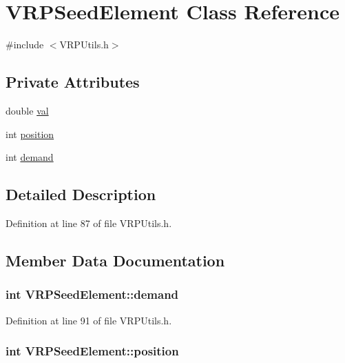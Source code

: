 \hypertarget{class_v_r_p_seed_element}{
\section{VRPSeedElement Class Reference}
\label{class_v_r_p_seed_element}
}


{\ttfamily \#include $<$VRPUtils.h$>$}

\subsection*{Private Attributes}
\begin{DoxyCompactItemize}
\item 
double \hyperlink{class_v_r_p_seed_element_a5afd4ea53120549e301ed93f7df7b859}{val}
\item 
int \hyperlink{class_v_r_p_seed_element_add73aa089748fedfde908840e6a73a5c}{position}
\item 
int \hyperlink{class_v_r_p_seed_element_af002e7fa5c63f0cc06fb711e6289cf24}{demand}
\end{DoxyCompactItemize}


\subsection{Detailed Description}


Definition at line 87 of file VRPUtils.h.



\subsection{Member Data Documentation}
\hypertarget{class_v_r_p_seed_element_af002e7fa5c63f0cc06fb711e6289cf24}{
\subsubsection[{demand}]{\setlength{\rightskip}{0pt plus 5cm}int {\bf VRPSeedElement::demand}}}
\label{class_v_r_p_seed_element_af002e7fa5c63f0cc06fb711e6289cf24}


Definition at line 91 of file VRPUtils.h.

\hypertarget{class_v_r_p_seed_element_add73aa089748fedfde908840e6a73a5c}{
\subsubsection[{position}]{\setlength{\rightskip}{0pt plus 5cm}int {\bf VRPSeedElement::position}}}
\label{class_v_r_p_seed_element_add73aa089748fedfde908840e6a73a5c}


